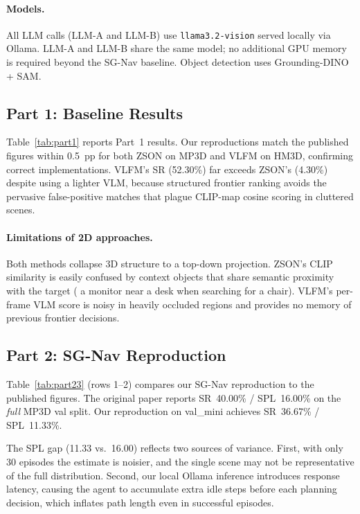 \documentclass[10pt,twocolumn,letterpaper]{article}
\begin{document}
\paragraph{Models.}
All LLM calls (LLM-A and LLM-B) use \texttt{llama3.2-vision} served
locally via Ollama.
LLM-A and LLM-B share the same model; no additional GPU memory is required
beyond the SG-Nav baseline.
Object detection uses Grounding-DINO + SAM.

\subsection{Part 1: Baseline Results}

Table~\ref{tab:part1} reports Part~1 results.
Our reproductions match the published figures within 0.5~pp for both
ZSON on MP3D and VLFM on HM3D, confirming correct implementations.
VLFM's SR (52.30\%) far exceeds ZSON's (4.30\%) despite using a lighter VLM,
because structured frontier ranking avoids the pervasive false-positive
matches that plague CLIP-map cosine scoring in cluttered scenes.

\paragraph{Limitations of 2D approaches.}
Both methods collapse 3D structure to a top-down projection.
ZSON's CLIP similarity is easily confused by context objects that share
semantic proximity with the target (\eg{} a monitor near a desk when
searching for a chair).
VLFM's per-frame VLM score is noisy in heavily occluded regions and
provides no memory of previous frontier decisions.

\subsection{Part 2: SG-Nav Reproduction}

Table~\ref{tab:part23} (rows 1--2) compares our SG-Nav reproduction to
the published figures.
The original paper reports SR~40.00\% / SPL~16.00\% on the \emph{full}
MP3D val split.
Our reproduction on val\_mini achieves SR~36.67\% / SPL~11.33\%.

The SPL gap (11.33 vs.\ 16.00) reflects two sources of variance.
First, with only 30 episodes the estimate is noisier, and the single scene
may not be representative of the full distribution.
Second, our local Ollama inference introduces response latency, causing the
agent to accumulate extra idle steps before each planning decision, which
inflates path length even in successful episodes.
\end{document}
